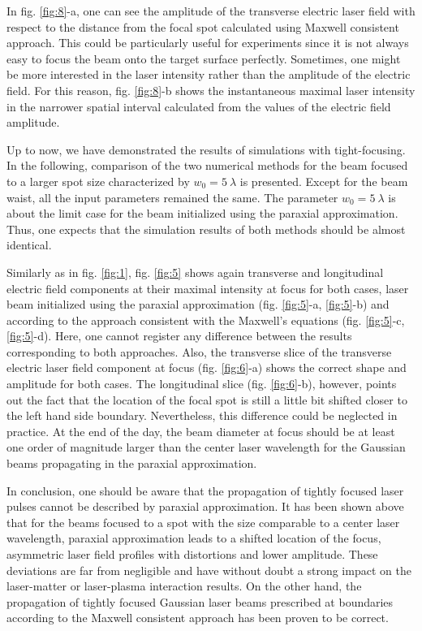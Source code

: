 In fig. \ref{fig:8}-a, one can see the amplitude of the transverse electric laser field with respect to the distance from the focal spot calculated using Maxwell consistent approach. This could be particularly useful for experiments since it is not always easy to focus the beam onto the target surface perfectly. Sometimes, one might be more interested in the laser intensity rather than the amplitude of the electric field. For this reason, fig. \ref{fig:8}-b shows the instantaneous maximal laser intensity in the narrower spatial interval calculated from the values of the electric field amplitude.

Up to now, we have demonstrated the results of simulations with tight-focusing. In the following, comparison of the two numerical methods for the beam focused to a larger spot size characterized by $ w_0 = 5 \ \lambda $ is presented. Except for the beam waist, all the input parameters remained the same. The parameter $ w_0 = 5 \ \lambda $ is about the limit case for the beam initialized using the paraxial approximation. Thus, one expects that the simulation results of both methods should be almost identical.

Similarly as in fig. \ref{fig:1}, fig. \ref{fig:5} shows again transverse and longitudinal electric field components at their maximal intensity at focus for both cases, laser beam initialized using the paraxial approximation (fig. \ref{fig:5}-a, \ref{fig:5}-b) and according to the approach consistent with the Maxwell's equations (fig. \ref{fig:5}-c, \ref{fig:5}-d). Here, one cannot register any difference between the results corresponding to both approaches. Also, the transverse slice of the transverse electric laser field component at focus (fig. \ref{fig:6}-a) shows the correct shape and amplitude for both cases. The longitudinal slice (fig. \ref{fig:6}-b), however, points out the fact that the location of the focal spot is still a little bit shifted closer to the left hand side boundary. Nevertheless, this difference could be neglected in practice. At the end of the day, the beam diameter at focus should be at least one order of magnitude larger than the center laser wavelength for the Gaussian beams propagating in the paraxial approximation.

In conclusion, one should be aware that the propagation of tightly focused laser pulses cannot be described by paraxial approximation. It has been shown above that for the beams focused to a spot with the size comparable to a center laser wavelength, paraxial approximation leads to a shifted location of the focus, asymmetric laser field profiles with distortions and lower amplitude. These deviations are far from negligible and have without doubt a strong impact on the laser-matter or laser-plasma interaction results. On the other hand, the propagation of tightly focused Gaussian laser beams prescribed at boundaries according to the Maxwell consistent approach has been proven to be correct.

